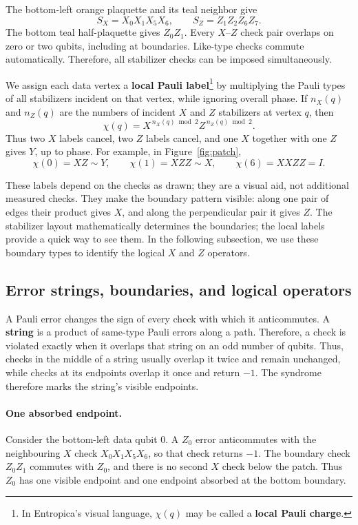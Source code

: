 \documentclass[11pt,a4paper]{article}
\begin{document}
The bottom-left orange plaquette and its teal neighbor give
\[
S_X=X_0X_1X_5X_6,\qquad S_Z=Z_1Z_2Z_6Z_7.
\]
The bottom teal half-plaquette gives $Z_0Z_1$.
Every $X$--$Z$ check pair overlaps on zero or two qubits, including at boundaries. Like-type checks commute automatically. Therefore, all stabilizer checks can be imposed simultaneously. 

We assign each data vertex a \textbf{local Pauli label}\footnote{In Entropica's visual language, $\chi(q)$ may be called a
\textbf{local Pauli charge}.} by multiplying
the Pauli types of all stabilizers incident on that vertex, while
ignoring overall phase. If $n_X(q)$ and $n_Z(q)$ are the numbers of
incident $X$ and $Z$ stabilizers at vertex $q$, then
\[
\chi(q)=X^{\,n_X(q)\bmod 2}Z^{\,n_Z(q)\bmod 2}.
\]
Thus two $X$ labels cancel, two $Z$ labels cancel, and one $X$ together
with one $Z$ gives $Y$, up to phase. For example, in Figure~\ref{fig:patch},
\[
\chi(0)=XZ\sim Y,\qquad
\chi(1)=XZZ\sim X,\qquad
\chi(6)=XXZZ=I.
\]

These labels depend on the checks as drawn; they are a visual aid, not additional measured checks. They make the boundary pattern visible: along one pair
of edges their product gives $X$, and along the perpendicular pair it
gives $Z$. The stabilizer layout mathematically determines the
boundaries; the local labels provide a quick way to see them. 
In the following subsection, we use these boundary types to identify the logical
$X$ and $Z$ operators.

\subsection{Error strings, boundaries, and logical operators}\label{sec:logical}
A Pauli error changes the sign of every check with which it anticommutes. A \textbf{string} is a product of same-type Pauli errors along a path. Therefore, a check is violated exactly when it overlaps that string on an odd number of qubits. 
Thus, checks in the middle of a string usually overlap it twice and remain unchanged, while checks at its endpoints overlap it once and return $-1$. The syndrome therefore marks the string's visible endpoints.

\paragraph{One absorbed endpoint.}
Consider the bottom-left data qubit $0$. A $Z_0$ error anticommutes with the neighbouring $X$ check $X_0X_1X_5X_6$, so that check returns $-1$. The boundary check $Z_0Z_1$ commutes with $Z_0$, and there is no second $X$ check below the patch. Thus $Z_0$ has one visible endpoint and one endpoint absorbed at the bottom boundary.
\end{document}
